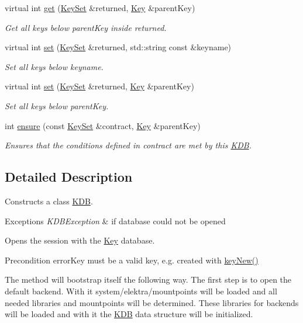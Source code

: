 \begin{DoxyCompactItemize}
virtual int \mbox{\hyperlink{classkdb_1_1KDB_a48770a7290699bf2b7529f3ab67e378f}{get}} (\mbox{\hyperlink{classkdb_1_1KeySet}{Key\+Set}} \&returned, \mbox{\hyperlink{classkdb_1_1Key}{Key}} \&parent\+Key)
\begin{DoxyCompactList}\small\item\em Get all keys below parent\+Key inside returned. \end{DoxyCompactList}\item 
virtual int \mbox{\hyperlink{classkdb_1_1KDB_a29087a6a1a7de334f4e5b62ffe5d6e6e}{set}} (\mbox{\hyperlink{classkdb_1_1KeySet}{Key\+Set}} \&returned, std\+::string const \&keyname)
\begin{DoxyCompactList}\small\item\em Set all keys below keyname. \end{DoxyCompactList}\item 
virtual int \mbox{\hyperlink{classkdb_1_1KDB_a62a4fafbe21d9519b31a7868aa05f3e3}{set}} (\mbox{\hyperlink{classkdb_1_1KeySet}{Key\+Set}} \&returned, \mbox{\hyperlink{classkdb_1_1Key}{Key}} \&parent\+Key)
\begin{DoxyCompactList}\small\item\em Set all keys below parent\+Key. \end{DoxyCompactList}\item 
int \mbox{\hyperlink{classkdb_1_1KDB_a1e2a35e42941b9fee756e528a3ef14b6}{ensure}} (const \mbox{\hyperlink{classkdb_1_1KeySet}{Key\+Set}} \&contract, \mbox{\hyperlink{classkdb_1_1Key}{Key}} \&parent\+Key)
\begin{DoxyCompactList}\small\item\em Ensures that the conditions defined in {\ttfamily contract} are met by this \mbox{\hyperlink{classkdb_1_1KDB}{K\+DB}}. \end{DoxyCompactList}\end{DoxyCompactItemize}


\subsection{Detailed Description}
Constructs a class \mbox{\hyperlink{classkdb_1_1KDB}{K\+DB}}. 


\begin{DoxyExceptions}{Exceptions}
{\em K\+D\+B\+Exception} & if database could not be opened\\
\hline
\end{DoxyExceptions}
Opens the session with the \mbox{\hyperlink{classkdb_1_1Key}{Key}} database. \begin{DoxyPrecond}{Precondition}
error\+Key must be a valid key, e.\+g. created with \mbox{\hyperlink{group__key_gad23c65b44bf48d773759e1f9a4d43b89}{key\+New()}}
\end{DoxyPrecond}
The method will bootstrap itself the following way. The first step is to open the default backend. With it system/elektra/mountpoints will be loaded and all needed libraries and mountpoints will be determined. These libraries for backends will be loaded and with it the {\ttfamily \mbox{\hyperlink{classkdb_1_1KDB}{K\+DB}}} data structure will be initialized.

